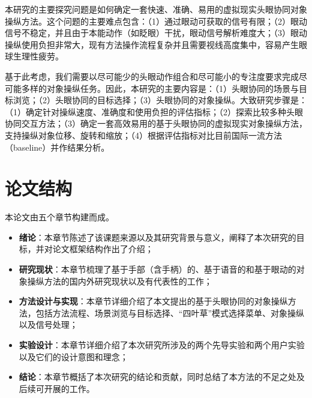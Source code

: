 本研究的主要探究问题是如何确定一套快速、准确、易用的虚拟现实头眼协同对象操纵方法。这个问题的主要难点包含：（1）通过眼动可获取的信号有限；（2）眼动信号不稳定，并且由于本能动作（如眨眼）干扰，眼动信号解析难度大；（3）眼动操纵使用负担非常大，现有方法操作流程复杂并且需要视线高度集中，容易产生眼球生理性疲劳。

基于此考虑，我们需要以尽可能少的头眼动作组合和尽可能小的专注度要求完成尽可能多样的对象操纵任务。因此，本研究的主要内容是：（1）头眼协同的场景与目标浏览；（2）头眼协同的目标选择；（3）头眼协同的对象操纵。大致研究步骤是：（1）确定针对操纵速度、准确度和使用负担的评估指标；（2）探索比较多种头眼协同交互方法；（3）确定一套高效易用的基于头眼协同的虚拟现实对象操纵方法，支持操纵对象位移、旋转和缩放；（4）根据评估指标对比目前国际一流方法（baseline）并作结果分析。

\section{论文结构}

本论文由五个章节构建而成。

\begin{itemize}
	\item {\bf 绪论}：本章节陈述了该课题来源以及其研究背景与意义，阐释了本次研究的目标，并对论文框架结构作出了介绍；
	\item {\bf 研究现状}：本章节梳理了基于手部（含手柄）的、基于语音的和基于眼动的对象操纵方法的国内外研究现状以及有代表性的工作；
	\item {\bf 方法设计与实现}：本章节详细介绍了本文提出的基于头眼协同的对象操纵方法，包括方法流程、场景浏览与目标选择、“四叶草”模式选择菜单、对象操纵以及信号处理；
	\item {\bf 实验设计}：本章节详细介绍了本次研究所涉及的两个先导实验和两个用户实验以及它们的设计意图和理念；
	\item {\bf 结论}：本章节概括了本次研究的结论和贡献，同时总结了本方法的不足之处及后续可开展的工作。
\end{itemize}